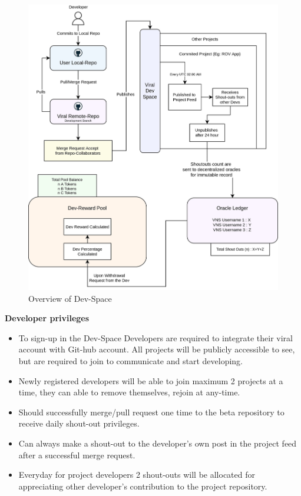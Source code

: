 \documentclass[conference]{IEEEtran}
\begin{document}
\begin{figure}
\begin{center}
\includegraphics[width=13cm]{devspace-overview}
\caption{Overview of Dev-Space}
\end{center}
\end{figure}

\textbf{Developer privileges}

\begin{itemize}[wide, labelwidth=!, labelindent=0pt]
\item To sign-up in the Dev-Space Developers are required to integrate their viral account with Git-hub account. All projects will be publicly accessible to see, but are required to join to communicate and start developing.
\item Newly registered developers will be able to join maximum 2 projects at a time, they can able to remove themselves, rejoin at any-time.
\item Should successfully merge/pull request one time to the beta repository to receive daily shout-out privileges.
\item Can always make a shout-out to the developer's own post in the project feed after a successful merge request.
\item Everyday for project developers 2 shout-outs will be allocated for appreciating other developer's contribution to the project repository.
\end{itemize}
\end{document}
